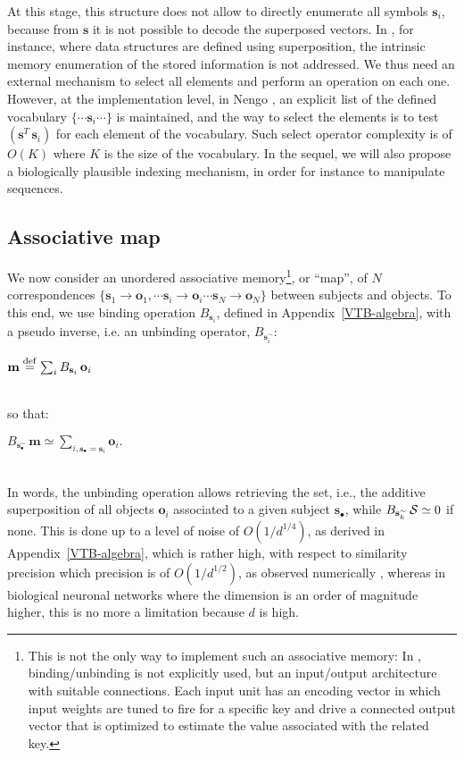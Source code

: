 \documentclass[sn-mathphys]{sn-jnl}
\newcommand{\defq}{\stackrel {\rm def}{=}}
\newcommand{\eqline}[1]{~\vspace{0.1cm}\\\centerline{$#1$}\vspace{0.1cm}\\}
\begin{document}
\begin{appendices}
At this stage, this structure does not allow to directly enumerate all symbols $\mathbf{s}_i$, because from $\mathbf{s}$ it is not possible to decode the superposed vectors. In \cite{crawford_biologically_2016}, for instance, where data structures are defined using superposition, the intrinsic memory enumeration of the stored information is not addressed. We thus need an external mechanism to select all elements and perform an operation on each one. However, at the implementation level, in Nengo \cite{eliasmith_how_2013}, an explicit list of the defined vocabulary $\{\cdots \mathbf{s}_i \cdots\}$ is maintained, and the way to select the elements is to test $(\mathbf{s}^T \, \mathbf{s}_i)$ for each element of the vocabulary. Such select operator complexity is of $O(K)$ where $K$ is the size of the vocabulary. In the sequel, we will also propose a biologically plausible indexing mechanism, in order for instance to manipulate sequences.

\subsection{Associative map}

We now consider an unordered associative memory\footnote{This is not the only way to implement such an associative memory: In \cite{voelker_learning_2014}, binding/unbinding is not explicitly used, but an input/output architecture with suitable connections. Each input unit has an encoding vector in which input weights are tuned to fire for a specific key and drive a connected output vector that is optimized to estimate the value associated with the related key.}, or ``map'', of $N$ correspondences $\{\mathbf{s}_1 \rightarrow \mathbf{o}_1, \cdots \mathbf{s}_i \rightarrow \mathbf{o}_i \cdots \mathbf{s}_N \rightarrow \mathbf{o}_N\}$ between subjects and objects. To this end, we use binding operation $B_{\mathbf{s}_i}$, defined in Appendix~\ref{VTB-algebra},  with a pseudo inverse, i.e. an unbinding operator, $B_{\mathbf{s}_i^\sim}$:
\eqline{\mathbf{m} \defq \sum_i B_{\mathbf{s}_i} \, \mathbf{o}_i}
so that:
\eqline{B_{\mathbf{s}_\bullet^\sim} \, \mathbf{m} \simeq \sum_{i, \mathbf{s}_\bullet = \mathbf{s}_i} \mathbf{o}_i.}
In words, the unbinding operation allows retrieving the set, i.e., the additive superposition of all objects $\mathbf{o}_i$ associated to a given subject $\mathbf{s}_\bullet$, while $B_{\mathbf{s}_k^\sim} \, {\cal S} \simeq 0$ if none. This is done up to a level of noise of $O(1/d^{1/4})$, as derived in Appendix~\ref{VTB-algebra}, which is rather high, with respect to similarity precision which precision is of $O(1/d^{1/2})$, as observed numerically \cite{schlegel_comparison_2020}, whereas in biological neuronal networks where the dimension is an order of magnitude higher, this is no more a limitation because $d$ is high. 


\end{appendices}
\end{document}
